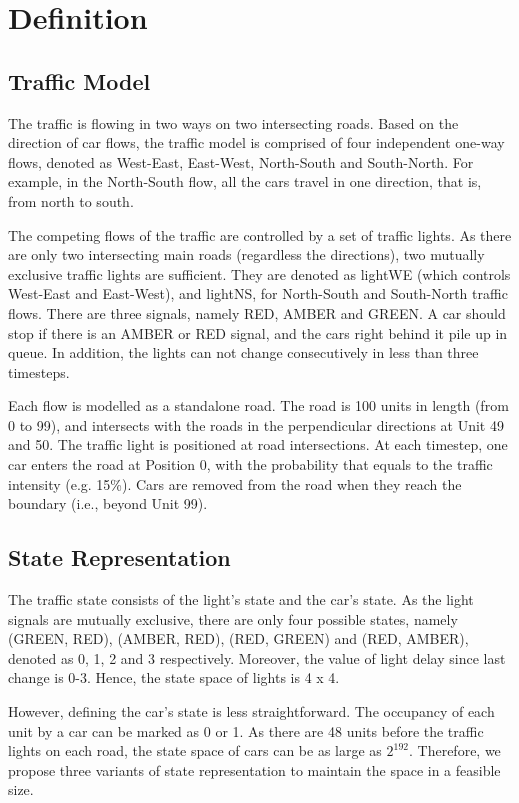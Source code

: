 \section{Definition}

\subsection{Traffic Model}
The traffic is flowing in two ways on two intersecting roads. Based on the direction of car flows, the traffic model is comprised of four independent one-way flows, denoted as West-East, East-West, North-South and South-North. For example, in the North-South flow, all the cars travel in one direction, that is, from north to south.

The competing flows of the traffic are controlled by a set of traffic lights. As there are only two intersecting main roads (regardless the directions), two mutually exclusive traffic lights are sufficient. They are denoted as lightWE (which controls West-East and East-West), and lightNS, for North-South and South-North traffic flows. There are three signals, namely RED, AMBER and GREEN. A car should stop if there is an AMBER or RED signal, and the cars right behind it pile up in queue. In addition, the lights can not change consecutively in less than three timesteps.

Each flow is modelled as a standalone road. The road is 100 units in length (from 0 to 99), and intersects with the roads in the perpendicular directions at Unit 49 and 50. The traffic light is positioned at road intersections. At each timestep, one car enters the road at Position 0, with the probability that equals to the traffic intensity (e.g. 15\%). Cars are removed from the road when they reach the boundary (i.e., beyond Unit 99).

\subsection{State Representation}
The traffic state consists of the light's state and the car's state. As the light signals are mutually exclusive, there are only four possible states, namely (GREEN, RED), (AMBER, RED), (RED, GREEN) and (RED, AMBER), denoted as 0, 1, 2 and 3 respectively. Moreover, the value of light delay since last change is 0-3. Hence, the state space of lights is 4 x 4.

However, defining the car's state is less straightforward. The occupancy of each unit by a car can be marked as 0 or 1. As there are 48 units before the traffic lights on each road, the state space of cars can be as large as $2^{192}$. Therefore, we propose three variants of state representation to maintain the space in a feasible size.

